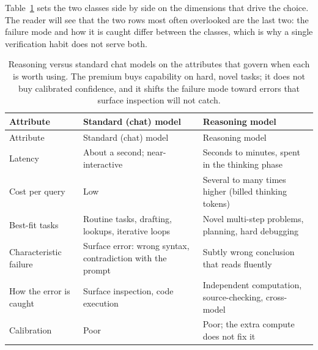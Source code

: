 \documentclass[
  letterpaper,
  11pt]{scrbook}
\begin{document}
Table~\ref{tbl-reasoning-vs-chat} sets the two classes side by side on
the dimensions that drive the choice. The reader will see that the two
rows most often overlooked are the last two: the failure mode and how it
is caught differ between the classes, which is why a single verification
habit does not serve both.

\begin{longtable}[]{@{}
  >{\raggedright\arraybackslash}p{}
  >{\raggedright\arraybackslash}p{}
  >{\raggedright\arraybackslash}p{}@{}}
\caption{Reasoning versus standard chat models on the attributes that
govern when each is worth using. The premium buys capability on hard,
novel tasks; it does not buy calibrated confidence, and it shifts the
failure mode toward errors that surface inspection will not
catch.}\label{tbl-reasoning-vs-chat}\tabularnewline
\toprule\noalign{}
\begin{minipage}[b]{\linewidth}\raggedright
Attribute
\end{minipage} & \begin{minipage}[b]{\linewidth}\raggedright
Standard (chat) model
\end{minipage} & \begin{minipage}[b]{\linewidth}\raggedright
Reasoning model
\end{minipage} \\
\midrule\noalign{}
\endfirsthead
\toprule\noalign{}
\begin{minipage}[b]{\linewidth}\raggedright
Attribute
\end{minipage} & \begin{minipage}[b]{\linewidth}\raggedright
Standard (chat) model
\end{minipage} & \begin{minipage}[b]{\linewidth}\raggedright
Reasoning model
\end{minipage} \\
\midrule\noalign{}
\endhead
\bottomrule\noalign{}
\endlastfoot
Latency & About a second; near-interactive & Seconds to minutes, spent
in the thinking phase \\
Cost per query & Low & Several to many times higher (billed thinking
tokens) \\
Best-fit tasks & Routine tasks, drafting, lookups, iterative loops &
Novel multi-step problems, planning, hard debugging \\
Characteristic failure & Surface error: wrong syntax, contradiction with
the prompt & Subtly wrong conclusion that reads fluently \\
How the error is caught & Surface inspection, code execution &
Independent computation, source-checking, cross-model \\
Calibration & Poor & Poor; the extra compute does not fix it \\
\end{longtable}
\end{document}

